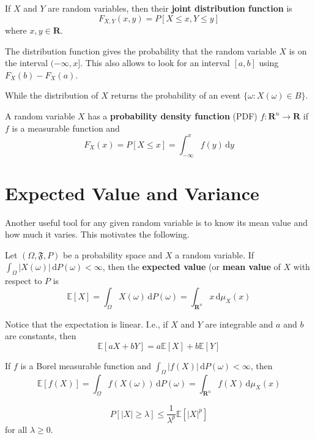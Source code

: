 \begin{definition}
	If $X$ and $Y$ are random variables, then their \textbf{joint distribution function} is
	\[
		F_{X,Y}(x,y) = P [X \leq x, Y \leq y]
	\]
	where $x,y \in \textbf{R}$.
\end{definition}

The distribution function gives the probability that the random variable $X$ is on the interval $(-\infty, x]$. This also allows to look for an interval $[a,b]$ using $F_X(b) - F_X(a)$.

While the distribution of $X$ returns the probability of an event $\{ \omega : X(\omega) \in B\}$.

\begin{definition}
	A random variable $X$ has a \textbf{probability density function} (PDF) $f : \textbf{R}^n \longrightarrow \textbf{R}$ if $f$ is a measurable function and \[ F_X(x) = P[X \leq x] = \int_{-\infty}^x f(y) \, \mathrm{d}y \]
\end{definition}

\section{Expected Value and Variance}

Another useful tool for any given random variable is to know its mean value and how much it varies. This motivates the following.

\begin{definition}[Expectation]
	Let $(\Omega, \mathfrak{F}, P)$ be a probability space and $X$ a random variable. If $\int_{\Omega} |X(\omega)|\, \mathrm{d}P(\omega) < \infty$, then the \textbf{expected value} (or \textbf{mean value} of $X$ with respect to $P$ is
	\[
		\mathbb{E}[X] = \int_{\Omega} X(\omega) \, \mathrm{d}P(\omega) = \int_{\textbf{R}^n} x \, \mathrm{d}\mu_X(x)
	\]
\end{definition}

Notice that the expectation is linear. I.e., if $X$ and $Y$ are integrable and $a$ and $b$ are constants, then \[ \mathbb{E} [aX+bY] = a \mathbb{E}[X] + b \mathbb{E}[Y] \]

If $f$ is a Borel measurable function and $\int_{\Omega} |f(X)| \, \mathrm{d} P(\omega) < \infty$, then
\[
	\mathbb{E}[f(X)] = \int_{\Omega} f(X(\omega)) \, \mathrm{d} P(\omega) = \int_{\textbf{R}^n} f(X) \, \mathrm{d}\mu_X(x)
\]

\begin{theorem}
	\[
		P[ |X| \geq \lambda] \leq \frac{1}{\lambda^p} \mathbb{E}[|X|^p]
	\]
	for all $\lambda \geq 0$.
\end{theorem}

